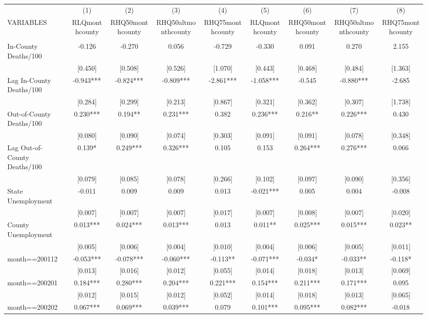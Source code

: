 \documentclass[]{article}
\begin{document}
\begin{tabular}{lcccccccc} \hline
 & (1) & (2) & (3) & (4) & (5) & (6) & (7) & (8) \\
VARIABLES & RLQmonthcounty & RHQ50monthcounty & RHQ50altmonthcounty & RHQ75monthcounty & RLQmonthcounty & RHQ50monthcounty & RHQ50altmonthcounty & RHQ75monthcounty \\ \hline
 &  &  &  &  &  &  &  &  \\
In-County Deaths/100 & -0.126 & -0.270 & 0.056 & -0.729 & -0.330 & 0.091 & 0.270 & 2.155 \\
 & [0.450] & [0.508] & [0.526] & [1.070] & [0.443] & [0.468] & [0.484] & [1.363] \\
Lag In-County Deaths/100 & -0.943*** & -0.824*** & -0.809*** & -2.861*** & -1.058*** & -0.545 & -0.880*** & -2.685 \\
 & [0.284] & [0.299] & [0.213] & [0.867] & [0.321] & [0.362] & [0.307] & [1.738] \\
Out-of-County Deaths/100 & 0.230*** & 0.194** & 0.231*** & 0.382 & 0.236*** & 0.216** & 0.226*** & 0.430 \\
 & [0.080] & [0.090] & [0.074] & [0.303] & [0.091] & [0.091] & [0.078] & [0.348] \\
Lag Out-of-County Deaths/100 & 0.139* & 0.249*** & 0.326*** & 0.105 & 0.153 & 0.264*** & 0.276*** & 0.066 \\
 & [0.079] & [0.085] & [0.078] & [0.266] & [0.102] & [0.097] & [0.090] & [0.356] \\
State Unemployment & -0.011 & 0.009 & 0.009 & 0.013 & -0.021*** & 0.005 & 0.004 & -0.008 \\
 & [0.007] & [0.007] & [0.007] & [0.017] & [0.007] & [0.008] & [0.007] & [0.020] \\
County Unemployment & 0.013*** & 0.024*** & 0.013*** & 0.013 & 0.011** & 0.025*** & 0.015*** & 0.023** \\
 & [0.005] & [0.006] & [0.004] & [0.010] & [0.004] & [0.006] & [0.005] & [0.011] \\
month==200112 & -0.053*** & -0.078*** & -0.060*** & -0.113** & -0.071*** & -0.034* & -0.033** & -0.118* \\
 & [0.013] & [0.016] & [0.012] & [0.055] & [0.014] & [0.018] & [0.013] & [0.069] \\
month==200201 & 0.184*** & 0.280*** & 0.204*** & 0.221*** & 0.154*** & 0.211*** & 0.171*** & 0.095 \\
 & [0.012] & [0.015] & [0.012] & [0.052] & [0.014] & [0.018] & [0.013] & [0.065] \\
month==200202 & 0.067*** & 0.069*** & 0.039*** & 0.079 & 0.101*** & 0.095*** & 0.082*** & -0.018 \\

\end{tabular}
\end{document}
